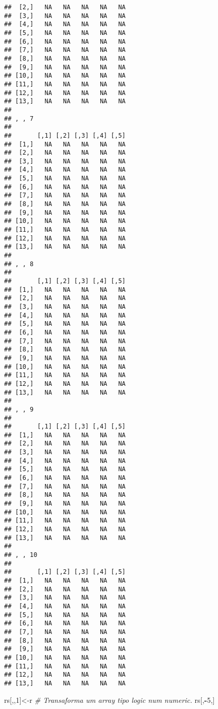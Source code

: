 \documentclass[]{article}
\newenvironment{Shaded}{\begin{snugshade}}{\end{snugshade}}
\newcommand{\DecValTok}[1]{\textcolor[rgb]{0.00,0.00,0.81}{#1}}
\newcommand{\CommentTok}[1]{\textcolor[rgb]{0.56,0.35,0.01}{\textit{#1}}}
\newcommand{\OperatorTok}[1]{\textcolor[rgb]{0.81,0.36,0.00}{\textbf{#1}}}
\newcommand{\NormalTok}[1]{#1}
\begin{document}
\begin{verbatim}
##  [2,]   NA   NA   NA   NA   NA
##  [3,]   NA   NA   NA   NA   NA
##  [4,]   NA   NA   NA   NA   NA
##  [5,]   NA   NA   NA   NA   NA
##  [6,]   NA   NA   NA   NA   NA
##  [7,]   NA   NA   NA   NA   NA
##  [8,]   NA   NA   NA   NA   NA
##  [9,]   NA   NA   NA   NA   NA
## [10,]   NA   NA   NA   NA   NA
## [11,]   NA   NA   NA   NA   NA
## [12,]   NA   NA   NA   NA   NA
## [13,]   NA   NA   NA   NA   NA
## 
## , , 7
## 
##       [,1] [,2] [,3] [,4] [,5]
##  [1,]   NA   NA   NA   NA   NA
##  [2,]   NA   NA   NA   NA   NA
##  [3,]   NA   NA   NA   NA   NA
##  [4,]   NA   NA   NA   NA   NA
##  [5,]   NA   NA   NA   NA   NA
##  [6,]   NA   NA   NA   NA   NA
##  [7,]   NA   NA   NA   NA   NA
##  [8,]   NA   NA   NA   NA   NA
##  [9,]   NA   NA   NA   NA   NA
## [10,]   NA   NA   NA   NA   NA
## [11,]   NA   NA   NA   NA   NA
## [12,]   NA   NA   NA   NA   NA
## [13,]   NA   NA   NA   NA   NA
## 
## , , 8
## 
##       [,1] [,2] [,3] [,4] [,5]
##  [1,]   NA   NA   NA   NA   NA
##  [2,]   NA   NA   NA   NA   NA
##  [3,]   NA   NA   NA   NA   NA
##  [4,]   NA   NA   NA   NA   NA
##  [5,]   NA   NA   NA   NA   NA
##  [6,]   NA   NA   NA   NA   NA
##  [7,]   NA   NA   NA   NA   NA
##  [8,]   NA   NA   NA   NA   NA
##  [9,]   NA   NA   NA   NA   NA
## [10,]   NA   NA   NA   NA   NA
## [11,]   NA   NA   NA   NA   NA
## [12,]   NA   NA   NA   NA   NA
## [13,]   NA   NA   NA   NA   NA
## 
## , , 9
## 
##       [,1] [,2] [,3] [,4] [,5]
##  [1,]   NA   NA   NA   NA   NA
##  [2,]   NA   NA   NA   NA   NA
##  [3,]   NA   NA   NA   NA   NA
##  [4,]   NA   NA   NA   NA   NA
##  [5,]   NA   NA   NA   NA   NA
##  [6,]   NA   NA   NA   NA   NA
##  [7,]   NA   NA   NA   NA   NA
##  [8,]   NA   NA   NA   NA   NA
##  [9,]   NA   NA   NA   NA   NA
## [10,]   NA   NA   NA   NA   NA
## [11,]   NA   NA   NA   NA   NA
## [12,]   NA   NA   NA   NA   NA
## [13,]   NA   NA   NA   NA   NA
## 
## , , 10
## 
##       [,1] [,2] [,3] [,4] [,5]
##  [1,]   NA   NA   NA   NA   NA
##  [2,]   NA   NA   NA   NA   NA
##  [3,]   NA   NA   NA   NA   NA
##  [4,]   NA   NA   NA   NA   NA
##  [5,]   NA   NA   NA   NA   NA
##  [6,]   NA   NA   NA   NA   NA
##  [7,]   NA   NA   NA   NA   NA
##  [8,]   NA   NA   NA   NA   NA
##  [9,]   NA   NA   NA   NA   NA
## [10,]   NA   NA   NA   NA   NA
## [11,]   NA   NA   NA   NA   NA
## [12,]   NA   NA   NA   NA   NA
## [13,]   NA   NA   NA   NA   NA
\end{verbatim}

\begin{Shaded}
\begin{Highlighting}[]
\NormalTok{rs[,,}\DecValTok{1}\NormalTok{]<-r }\CommentTok{# Transaforma um array tipo logic num numeric.}
\NormalTok{rs[,}\OperatorTok{-}\DecValTok{5}\NormalTok{,]}
\end{Highlighting}
\end{Shaded}
\end{document}
